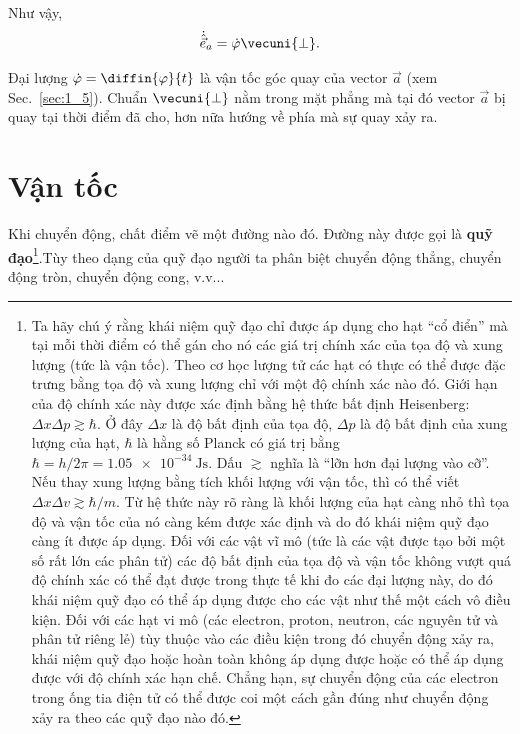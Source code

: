 \noindent
Như vậy,
\begin{equation}\label{eq:1_56}
\dot{\hat{\vec{e}}}_{a} = \dot{\varphi}\vecuni{\perp}.
\end{equation}

\noindent
Đại lượng $\dot{\varphi}=\diffin{\varphi}{t}$ là vận tốc góc quay của vector $\vec{a}$ (xem Sec.~\ref{sec:1_5}). Chuẩn $\vecuni{\perp}$ nằm trong mặt phẳng mà tại đó vector $\vec{a}$ bị quay tại thời điểm đã cho, hơn nữa hướng về phía mà sự quay xảy ra.

\section{Vận tốc}\label{sec:1_3}

Khi chuyển động, chất điểm vẽ một đường nào đó. Đường này được gọi là \textbf{quỹ đạo}\footnote{Ta hãy chú ý rằng khái niệm quỹ đạo chỉ được áp dụng cho hạt ``cổ điển'' mà tại mỗi thời điểm có thể gán cho nó các giá trị chính xác của tọa độ và xung lượng (tức là vận tốc). Theo cơ học lượng tử các hạt có thực có thể được đặc trưng bằng tọa độ và xung lượng chỉ với một độ chính xác nào đó. Giới hạn của độ chính xác này được xác định bằng hệ thức bất định Heisenberg: $\Delta x\Delta p\gtrsim\hbar$. Ở đây $\Delta x$ là độ bất định của tọa độ, $\Delta p$ là độ bất định của xung lượng của hạt, $\hbar$ là hằng số Planck có giá trị bằng $\hbar = h/2\pi = \SI{1.05e-34}{\joule\second}$. Dấu $\gtrsim$ nghĩa là ``lỡn hơn đại lượng vào cỡ''. Nếu thay xung lượng bằng tích khối lượng với vận tốc, thì có thể viết $\Delta x\Delta v\gtrsim\hbar/m$. Từ hệ thức này rõ ràng là khối lượng của hạt càng nhỏ thì tọa độ và vận tốc của nó càng kém được xác định và do đó khái niệm quỹ đạo càng ít được áp dụng. Đối với các vật vĩ mô (tức là các vật được tạo bởi một số rất lớn các phân tử) các độ bất định của tọa độ và vận tốc không vượt quá độ chính xác có thể đạt được trong thực tế khi đo các đại lượng này, do đó khái niệm quỹ đạo có thể áp dụng được cho các vật như thế một cách vô điều kiện. Đối với các hạt vi mô (các electron, proton, neutron, các nguyên tử và phân tử riêng lẻ) tùy thuộc vào các điều kiện trong đó chuyển động xảy ra, khái niệm quỹ đạo hoặc hoàn toàn không áp dụng được hoặc có thể áp dụng được với độ chính xác hạn chế. Chẳng hạn, sự chuyển động của các electron trong ống tia điện tử có thể được coi một cách gần đúng như chuyển động xảy ra theo các quỹ đạo nào đó.}.Tùy theo dạng của quỹ đạo người ta phân biệt chuyển động thẳng, chuyển động tròn, chuyển động cong, v.v...

